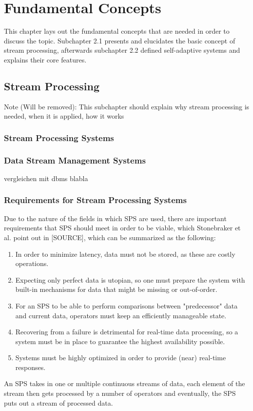 \chapter{Fundamental Concepts}
This chapter lays out the fundamental concepts that are needed in order to discuss the topic.
Subchapter 2.1 presents and elucidates the basic concept of stream processing, afterwards
subchapter 2.2 defined self-adaptive systems and explains their core features.
\section{Stream Processing}
Note (Will be removed): This subchapter should explain why stream processing is needed, when it is applied, how it works
\subsection{Stream Processing Systems}
\subsection{Data Stream Management Systems}
vergleichen mit dbms blabla
\subsection{Requirements for Stream Processing Systems}
Due to the nature of the fields in which SPS are used, there are important requirements that SPS should meet in order to be viable, which Stonebraker et al. point out in [SOURCE], which can be summarized as the following:
\begin{enumerate}
\item {} In order to minimize latency, data must not be stored, as these are costly operations.
\item {} Expecting only perfect data is utopian, so one must prepare the system with built-in mechanisms for data that might be missing or out-of-order.
\item {} For an SPS to be able to perform comparisons between "predecessor" data and current data, operators must keep an efficiently manageable state.
\item {} Recovering from a failure is detrimental for real-time data processing, so a system must be in place to guarantee the highest availability possible.
\item {} Systems must be highly optimized in order to provide (near) real-time responses.
\end{enumerate}
An SPS takes in one or multiple continuous streams of data, each element of the stream then gets processed by a number of operators and eventually, the SPS puts out a stream of processed data.

